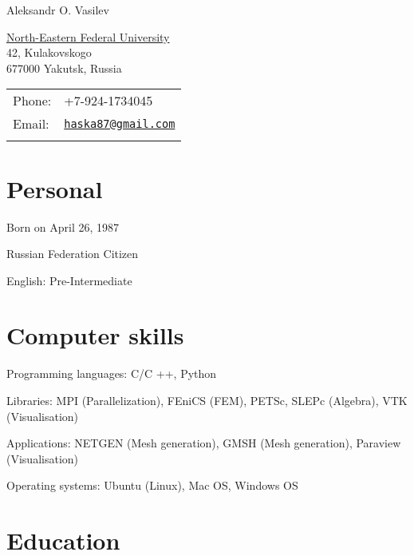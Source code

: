 \documentclass[a4paper]{article}
\def\name{Aleksandr O. Vasilev}
\renewenvironment{itemize}{
  \begin{list}{}{
    \setlength{\leftmargin}{1.5em}
  }
}{
  \end{list}
}
\begin{document}
{\huge \name}


\vspace{0.25in}

\begin{minipage}{0.45\linewidth}
  \href{http://www.s-vfu.ru/user/user.php?id=732071}{North-Eastern Federal University} \\
  42, Kulakovskogo \\
  677000 Yakutsk, Russia
\end{minipage}
\begin{minipage}{0.45\linewidth}
  \begin{tabular}{ll}
    Phone: & +7-924-1734045 \\
    Email: & \href{mailto:haska87@gmail.com}{\tt haska87@gmail.com}  \\ \\
  \end{tabular}
\end{minipage}

\section*{Personal}

\begin{itemize}
\item Born on April 26, 1987
\item Russian Federation Citizen
\item English: Pre-Intermediate
\end{itemize}

\section*{Computer skills}

\begin{itemize}
\item Programming languages: C/C ++, Python
\item Libraries: MPI (Parallelization), FEniCS (FEM), PETSc, SLEPc (Algebra), VTK (Visualisation)
\item Applications: NETGEN (Mesh generation), GMSH (Mesh generation), Paraview (Visualisation)
\item Operating systems: Ubuntu (Linux), Mac OS, Windows OS
\end{itemize}


\section*{Education}
\end{document}
